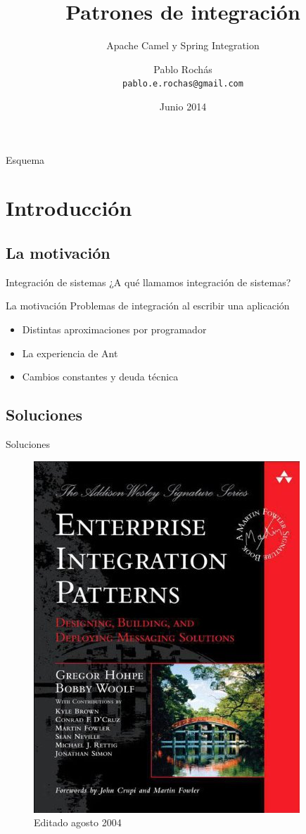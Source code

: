 \documentclass{beamer}
\title{Patrones de integración}
\subtitle{Apache Camel y Spring Integration}
\author[Despegar.com]{Pablo Rochás\\ \texttt{pablo.e.rochas@gmail.com}}
\date[Despegar]{Junio 2014}
\begin{document}
\begin{frame}
\titlepage
\end{frame}

\begin{frame}{Esquema}
  \tableofcontents
\end{frame}

\section{Introducción}
\subsection{La motivación}
\begin{frame}{Integración de sistemas}
¿A qué llamamos integración de sistemas?
\end{frame}

\begin{frame}{La motivación}
Problemas de integración al escribir una aplicación
\begin{itemize}[<+->]
\item Distintas aproximaciones por programador
\item La experiencia de Ant
\item Cambios constantes y deuda técnica
\end{itemize}
\end{frame}

\subsection{Soluciones}
\begin{frame}{Soluciones}
\begin{figure}
\includegraphics[scale=0.4]{TAPA}
\caption{Editado agosto 2004}
\end{figure}
\end{frame}
\end{document}
